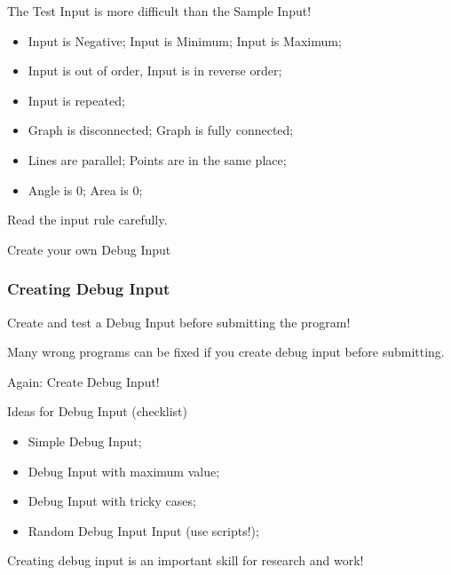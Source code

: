 \begin{frame}{The Test Input is more difficult than the Sample Input!}

    \begin{itemize}
      \item Input is Negative; Input is Minimum; Input is Maximum;
      \item Input is out of order, Input is in reverse order;
      \item Input is repeated;\medskip

      \item Graph is disconnected; Graph is fully connected;
      \item Lines are parallel; Points are in the same place;
      \item Angle is 0; Area is 0;\medskip
    \end{itemize}

    \begin{block}{}
      Read the input rule carefully.\medskip
      
      Create your own \alert{Debug Input}
    \end{block}
\end{frame}

\begin{frame}
  \frametitle{Creating Debug Input}

  Create and test a \alert{Debug Input} before submitting the program!\bigskip

  Many wrong programs can be fixed if you create debug input before submitting.\bigskip

  Again: \alert{Create Debug Input!}

  \begin{exampleblock}{Ideas for Debug Input (checklist)}
    \begin{itemize}
      \item Simple Debug Input;
      \item Debug Input with maximum value;
      \item Debug Input with tricky cases;
      \item Random Debug Input Input (use scripts!);
    \end{itemize}
  \end{exampleblock}

  Creating debug input is an important skill for research and work!
\end{frame}


